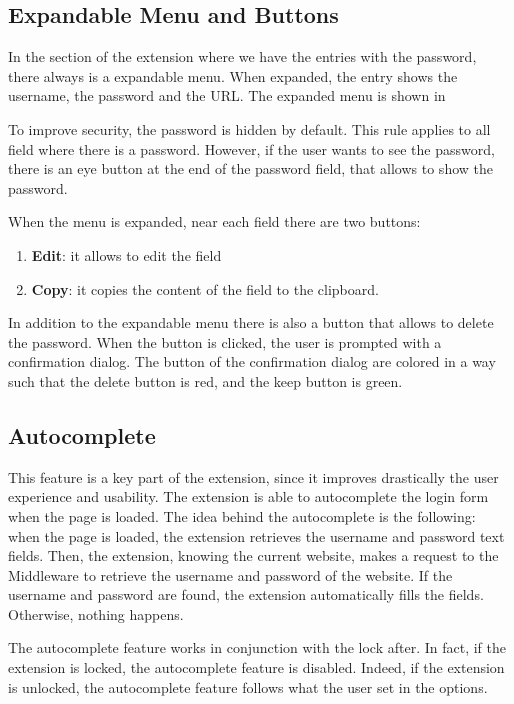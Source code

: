 
\subsection{Expandable Menu and Buttons}

In the section of the extension where we have the entries with the password, there always is a expandable menu. When expanded, the entry shows the username, the password and the URL. The expanded menu is shown in %

To improve security, the password is hidden by default. This rule applies to all field where there is a password. However, if the user wants to see the password, there is an eye button at the end of the password field, that allows to show the password.

When the menu is expanded, near each field there are two buttons:

\begin{enumerate}
    \item \textbf{Edit}: it allows to edit the field
    \item \textbf{Copy}: it copies the content of the field to the clipboard.
\end{enumerate}

In addition to the expandable menu there is also a button that allows to delete the password. When the button is clicked, the user is prompted with a confirmation dialog. The button of the confirmation dialog are colored in a way such that the delete button is red, and the keep button is green.


\subsection{Autocomplete}

This feature is a key part of the extension, since it improves drastically the user experience and usability. The extension is able to autocomplete the login form when the page is loaded. 
The idea behind the autocomplete is the following: when the page is loaded, the extension retrieves the username and password text fields. Then, the extension, knowing the current website, makes a request to the Middleware to retrieve the username and password of the website. If the username and password are found, the extension automatically fills the fields. Otherwise, nothing happens.

The autocomplete feature works in conjunction with the lock after. In fact, if the extension is locked, the autocomplete feature is disabled. Indeed, if the extension is unlocked, the autocomplete feature follows what the user set in the options.
